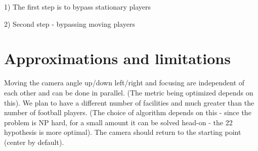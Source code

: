 1) The first step is to bypass stationary players

2) Second step - bypassing moving players







\section{Approximations and limitations}
 
Moving the camera angle up/down left/right and focusing are independent of each other and can be done in parallel. (The metric being optimized depends on this). We plan to have a different number of facilities and much greater than the number of football players. (The choice of algorithm depends on this - since the problem is NP hard, for a small amount it can be solved head-on - the 22 hypothesis is more optimal). The camera should return to the starting point (center by default).

 
